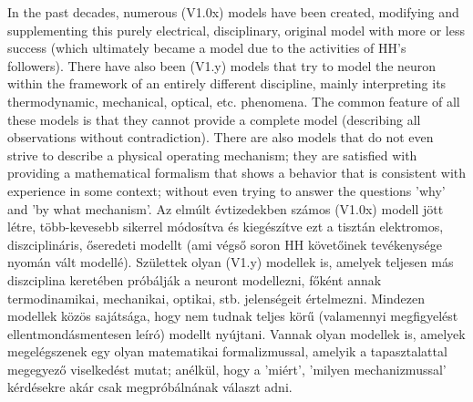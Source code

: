 \ifx\magyar\undefined %
In the past decades, numerous (V1.0x) models have been created, modifying and supplementing this purely electrical, disciplinary, original model with more or less success (which ultimately became a model due to the activities of \gls{HH}'s followers).
There have also been (V1.y) models that try to model the neuron within the framework of an entirely different discipline, mainly interpreting its thermodynamic, mechanical, optical, etc. phenomena.
The common feature of all these models is that they cannot provide a complete model (describing all observations without contradiction).
There are also models that do not even strive to describe a physical operating mechanism; they are satisfied with providing a mathematical formalism that shows a behavior that is consistent with experience in some context;
without even trying to answer the questions 'why' and 'by what mechanism'.
\else %
Az elmúlt évtizedekben számos (V1.0x) modell jött létre, több-kevesebb si\-kerrel módosítva és kiegészítve ezt a tisztán elektromos, diszciplináris, őseredeti modellt (ami végső soron \gls{HH} követőinek 
tevékenysége nyomán vált modellé). Születtek olyan (V1.y) modellek is, amelyek 
teljesen más diszciplina keretében próbálják a neuront modellezni,
főként annak termodinamikai, mechanikai, optikai, stb. jelenségeit értelmezni.
Mindezen modellek közös sajátsága, hogy nem tudnak teljes körű
(valamennyi megfigyelést ellentmondásmentesen leíró) modellt nyújtani.
Vannak olyan modellek is, amelyek 
megelégszenek egy olyan matematikai formalizmussal, amelyik
a tapasztalattal megegyező viselkedést mutat; anélkül, hogy
a 'miért', 'milyen mechanizmussal' kérdésekre akár csak megpróbálnának
választ adni. 
\fi

